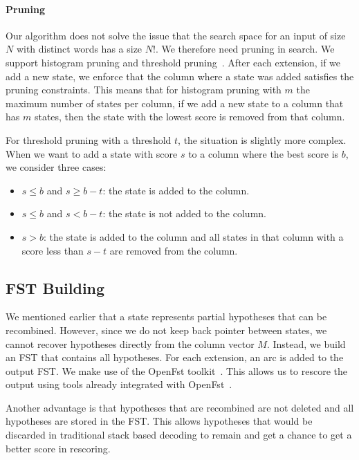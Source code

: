 \paragraph{Pruning}
Our algorithm does not solve the issue that the search space for an input
of size $N$ with distinct words has a size $N!$. We therefore need pruning
in search.
We support histogram pruning and threshold pruning~\citep{koehn:2010:book}.
After each extension, if we add a new state, we enforce that the column where
a state was added satisfies the pruning constraints. This means that for
histogram pruning with $m$ the maximum number of states per column, if we
add a new state to a column that has $m$ states, then the state with the lowest
score is removed from that column.

For threshold pruning with a threshold $t$, the situation is
slightly more complex. When we want to add a state with score $s$ to a column where the best score
is $b$, we consider three cases:
%
\begin{itemize}
  \item $s \leq b$ and $s \geq b - t$: the state is added to the column.
  \item $s \leq b$ and $s < b - t$: the state is not added to the column.
  \item $s > b$: the state is added to the column and all states in that
    column with a score less than $s - t$ are removed from the column.
\end{itemize}

\subsection{FST Building}

We mentioned earlier that a state represents partial hypotheses that can
be recombined. However, since we do not keep back pointer between states,
we cannot recover hypotheses directly from the column vector $M$.
Instead, we build an FST that contains all hypotheses. For each extension,
an arc is added to the output FST. We make use of the OpenFst
toolkit~\citep{allauzen-riley-schalkwyk-skut-mohri:2007:CIAA}.
This allows us to rescore the output using tools already integrated
with OpenFst~\citep{blackwood:2010:PHD}.

Another advantage is that hypotheses that are recombined are
not deleted and all hypotheses are stored in the FST. This allows hypotheses
that would be discarded in traditional stack based decoding
to remain and get a chance to get a better score in rescoring.

